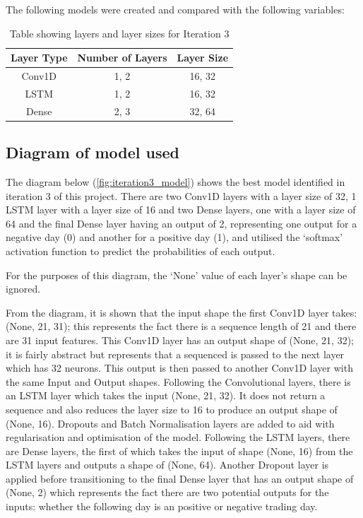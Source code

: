 The following models were created and compared with the following variables:

\begin{table}[ht]
    \centering
    \begin{tabular}{|c|c|c|}
        \hline
        Layer Type & Number of Layers & Layer Size \\
        \hline\hline
        Conv1D & 1, 2 & 16, 32 \\
        LSTM & 1, 2 & 16, 32 \\
        Dense & 2, 3 & 32, 64 \\
        \hline
    \end{tabular}
    \caption{Table showing layers and layer sizes for Iteration 3}
    \label{tab:iteration3_layers}
\end{table}
\FloatBarrier

\subsection{Diagram of model used}
The diagram below (\autoref{fig:iteration3_model}) shows the best model identified in iteration 3 of this project.
There are two Conv1D layers with a layer size of 32, 1 LSTM layer with a layer size of 16 and two Dense layers, one
with a layer size of 64 and the final Dense layer having an output of 2, representing one output for
a negative day (0) and another for a positive day (1), and utilised the `softmax' activation function to predict the
probabilities of each output.

For the purposes of this diagram, the `None' value of each layer's shape can be ignored.

From the diagram, it is shown that the input shape the first Conv1D layer takes: (None, 21, 31); this represents the
fact there is a sequence length of 21 and there are 31 input features.  This Conv1D layer has an output shape of (None, 21, 32); it is fairly abstract
but represents that a sequenced is passed to the next layer which has 32 neurons. This output is then passed to another
Conv1D layer with the same Input and Output shapes. Following the Convolutional layers, there is an LSTM layer
which takes the input (None, 21, 32). It does not return a sequence and also reduces the layer size to 16 to produce an
output shape of (None, 16). Dropouts and Batch Normalisation layers are added to aid with regularisation and optimisation of the model.
Following the LSTM layers, there are Dense layers, the first of which takes the input of shape (None, 16) from the
LSTM layers and outputs a shape of (None, 64). Another Dropout layer is applied before transitioning to the final Dense layer that has an output shape of (None, 2)
which represents the fact there are two potential outputs for the inputs: whether the following day
is an positive or negative trading day.

